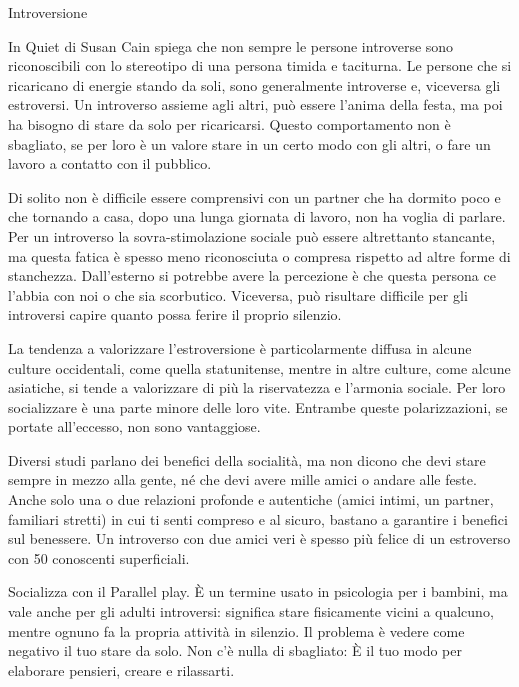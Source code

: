 \documentclass[12pt]{book} %
\begin{document}
\begin{mdframed}[linewidth=1pt]
Introversione

In Quiet di Susan Cain spiega che non sempre le persone introverse sono riconoscibili con lo stereotipo di una persona timida e taciturna. Le persone che si ricaricano di energie stando da soli, sono generalmente introverse e, viceversa gli estroversi. Un introverso assieme agli altri, può essere l'anima della festa, ma poi ha bisogno di stare da solo per ricaricarsi. Questo comportamento non è sbagliato, se per loro è un valore stare in un certo modo con gli altri, o fare un lavoro a contatto con il pubblico.

Di solito non è difficile essere comprensivi con un partner che ha dormito poco e che tornando a casa, dopo una lunga giornata di lavoro, non ha voglia di parlare. Per un introverso la sovra-stimolazione sociale può essere altrettanto stancante, ma questa fatica è spesso meno riconosciuta o compresa rispetto ad altre forme di stanchezza. Dall'esterno si potrebbe avere la percezione è che questa persona ce l'abbia con noi o che sia scorbutico. Viceversa, può risultare difficile per gli introversi capire quanto possa ferire il proprio silenzio. 

La tendenza a valorizzare l’estroversione è particolarmente diffusa in alcune culture occidentali, come quella statunitense, mentre in altre culture, come alcune asiatiche, si tende a valorizzare di più la riservatezza e l’armonia sociale. Per loro socializzare è una parte minore delle loro vite. Entrambe queste polarizzazioni, se portate all'eccesso, non sono vantaggiose.

Diversi studi parlano dei benefici della socialità, ma non dicono che devi stare sempre in mezzo alla gente, né che devi avere mille amici o andare alle feste. Anche solo una o due relazioni profonde e autentiche (amici intimi, un partner, familiari stretti) in cui ti senti compreso e al sicuro, bastano a garantire i benefici sul benessere.
Un introverso con due amici veri è spesso più felice di un estroverso con 50 conoscenti superficiali.

Socializza con il Parallel play. È un termine usato in psicologia per i bambini, ma vale anche per gli adulti introversi: significa stare fisicamente vicini a qualcuno, mentre ognuno fa la propria attività in silenzio.
Il problema è vedere come negativo il tuo stare da solo. Non c'è nulla di sbagliato: È il tuo modo per elaborare pensieri, creare e rilassarti. 
\end{mdframed}
\end{document}
